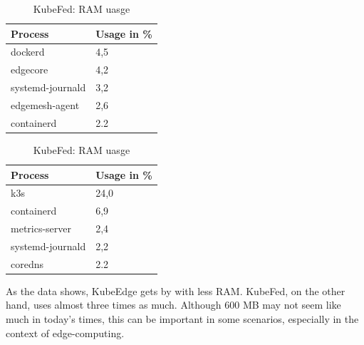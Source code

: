 \documentclass[MSC,Master,english]{twbook}%
\begin{document}
\begin{table}[ht]
    \begin{center}
        \begin{minipage}{.49\linewidth}
            \begin{center}
                \begin{tabular}{|l|l|}
                    \hline
                    Process & Usage in \%  \\
                    \hline
                    dockerd & 4,5 \\
                    edgecore & 4,2 \\
                    systemd-journald & 3,2 \\
                    edgemesh-agent & 2,6 \\
                    containerd & 2.2 \\
                    \hline
                \end{tabular}
                \caption{KubeEdge: RAM uasge}
                \label{tab:ke-ram-noload}
            \end{center}
        \end{minipage}
        \begin{minipage}{.49\linewidth}
            \begin{center}
                \begin{tabular}{|l|l|}
                    \hline
                    Process & Usage in \% \\
                    \hline
                    k3s & 24,0 \\
                    containerd & 6,9 \\
                    metrics-server & 2,4 \\
                    systemd-journald & 2,2 \\
                    coredns & 2.2 \\
                    \hline
                \end{tabular}
                \caption{KubeFed: RAM uasge}
                \label{tab:kf-ram-noload}
            \end{center}
        \end{minipage}
    \end{center}
\end{table}
As the data shows, KubeEdge gets by with less RAM. KubeFed, on the other hand, uses almost three times as much. Although 600 MB may not seem like much in today's times, this can be important in some scenarios, especially in the context of edge-computing.
\end{document}
